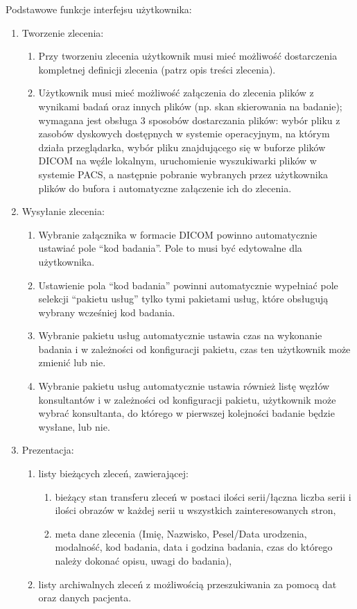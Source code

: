 \documentclass[a4paper]{report}
\begin{document}
Podstawowe funkcje interfejsu użytkownika:
\begin{enumerate}
  \item Tworzenie zlecenia:
      \begin{enumerate}
      \item Przy tworzeniu zlecenia użytkownik musi mieć możliwość dostarczenia kompletnej definicji zlecenia (patrz opis treści zlecenia).
      \item Użytkownik musi mieć możliwość załączenia do zlecenia plików z wynikami badań oraz innych plików (np. skan  skierowania na badanie); wymagana jest obsługa 3 sposobów dostarczania plików: wybór pliku z zasobów dyskowych dostępnych w systemie operacyjnym, na którym działa przeglądarka, wybór pliku znajdującego się w buforze plików DICOM na węźle lokalnym, uruchomienie wyszukiwarki plików w systemie PACS, a następnie pobranie wybranych przez użytkownika plików do bufora i automatyczne załączenie ich do zlecenia.
      \end{enumerate}
  \item Wysyłanie zlecenia:
      \begin{enumerate}
      \item Wybranie załącznika w formacie DICOM powinno automatycznie ustawiać pole "`kod badania"'. Pole to musi być edytowalne dla użytkownika.
      \item Ustawienie pola "`kod badania"' powinni automatycznie wypełniać pole selekcji "`pakietu usług"' tylko tymi pakietami usług, które obsługują wybrany wcześniej kod badania.
      \item Wybranie pakietu usług automatycznie ustawia czas na wykonanie badania i w zależności od konfiguracji pakietu, czas ten użytkownik może zmienić lub nie.
      \item Wybranie pakietu usług automatycznie ustawia również listę węzłów konsultantów i w zależności od konfiguracji pakietu, użytkownik może wybrać konsultanta, do którego w pierwszej kolejności badanie będzie wysłane, lub nie.
      \end{enumerate}
  \item Prezentacja:
    \begin{enumerate}
      \item listy bieżących zleceń, zawierającej:
	  \begin{enumerate}
	  \item bieżący stan transferu zleceń w postaci ilości serii/łączna liczba serii i ilości obrazów w każdej serii u wszystkich zainteresowanych stron,
	  \item meta dane zlecenia (Imię, Nazwisko, Pesel/Data urodzenia, modalność, kod badania, data i godzina badania, czas do którego należy dokonać opisu, uwagi do badania),
	  \end{enumerate}
      \item listy archiwalnych zleceń z możliwością przeszukiwania za pomocą dat oraz danych pacjenta.
    \end{enumerate}

\end{enumerate}
\end{document}
